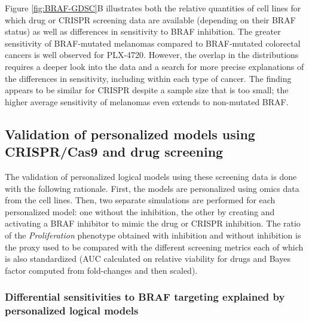 \documentclass[a4paper,12pt,twoside,onecolumn,openright,final,oldfontcommands]{memoir}
\begin{document}
Figure \ref{fig:BRAF-GDSC}B illustrates both the relative quantities of
cell lines for which drug or CRISPR screening data are available
(depending on their BRAF status) as well as differences in sensitivity
to BRAF inhibition. The greater sensitivity of BRAF-mutated melanomas
compared to BRAF-mutated colorectal cancers is well observed for
PLX-4720. However, the overlap in the distributions requires a deeper
look into the data and a search for more precise explanations of the
differences in sensitivity, including within each type of cancer. The
finding appears to be similar for CRISPR despite a sample size that is
too small; the higher average sensitivity of melanomas even extends to
non-mutated BRAF.

\subsection{Validation of personalized models using CRISPR/Cas9 and drug
screening}\label{validation-of-personalized-models-using-crisprcas9-and-drug-screening}

The validation of personalized logical models using these screening data
is done with the following rationale. First, the models are personalized
using omics data from the cell lines. Then, two separate simulations are
performed for each personalized model: one without the inhibition, the
other by creating and activating a BRAF inhibitor to mimic the drug or
CRISPR inhibition. The ratio of the \emph{Proliferation} phenotype
obtained with inhibition and without inhibition is the proxy used to be
compared with the different screening metrics each of which is also
standardized (AUC calculated on relative viability for drugs and Bayes
factor computed from fold-changes and then scaled).

\subsubsection{Differential sensitivities to BRAF targeting explained by
personalized logical
models}\label{differential-sensitivities-to-braf-targeting-explained-by-personalized-logical-models}
\end{document}

